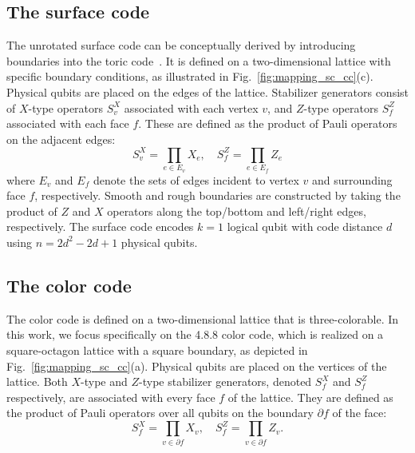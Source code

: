 \documentclass[%
 reprint,
 amsmath,amssymb,
 aps,
]{revtex4-2}
\begin{document}
\subsection{The surface code}
The unrotated surface code can be conceptually derived by introducing boundaries into the toric code~\cite{kitaev2003fault}. It is defined on a two-dimensional lattice with specific boundary conditions, as illustrated in Fig.~\ref{fig:mapping_sc_cc}(c). Physical qubits are placed on the edges of the lattice. Stabilizer generators consist of $X$-type operators $S^X_v$ associated with each vertex $v$, and $Z$-type operators $S^Z_f$ associated with each face $f$. These are defined as the product of Pauli operators on the adjacent edges: 
$$S^X_v=\prod_{e\in E_v}X_e,\quad S^Z_f=\prod_{e\in E_f}Z_e$$
where $E_v$ and $E_f$ denote the sets of edges incident to vertex $v$ and surrounding face $f$, respectively. Smooth and rough boundaries are constructed by taking the product of $Z$ and $X$ operators along the top/bottom and left/right edges, respectively. The surface code encodes $k=1$ logical qubit with code distance $d$ using $n=2d^2-2d+1$ physical qubits.



\subsection{The color code}
The color code is defined on a two-dimensional lattice that is three-colorable. In this work, we focus specifically on the 4.8.8 color code, which is realized on a square-octagon lattice with a square boundary, as depicted in Fig.~\ref{fig:mapping_sc_cc}(a). Physical qubits are placed on the vertices of the lattice. Both $X$-type and $Z$-type stabilizer generators, denoted $S^X_f$ and $S^Z_f$ respectively, are associated with every face $f$ of the lattice. They are defined as the product of Pauli operators over all qubits on the boundary $\partial f$ of the face:
\begin{equation}
    S^X_f=\prod_{v\in \partial f}X_v, \quad S^Z_f=\prod_{v\in \partial f}Z_v.
\end{equation}
\end{document}
